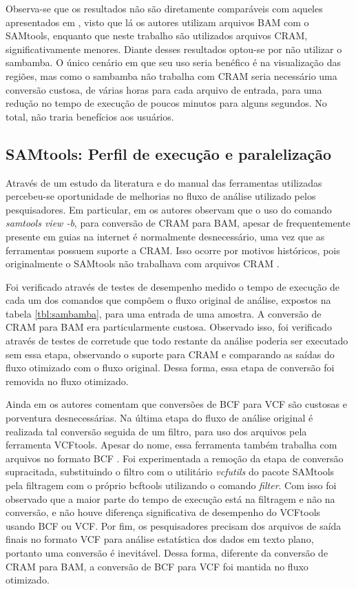 \documentclass[cic,tc]{iiufrgs}
\begin{document}
Observa-se que os resultados não são diretamente comparáveis com aqueles
apresentados em \cite{tarasov2015sambamba}, visto que lá os autores utilizam
arquivos BAM com o SAMtools, enquanto que neste trabalho são utilizados
arquivos CRAM, significativamente menores. Diante desses resultados optou-se
por não utilizar o sambamba. O único cenário em que seu uso seria benéfico é na
visualização das regiões, mas como o sambamba não trabalha com CRAM seria
necessário uma conversão custosa, de várias horas para cada arquivo de entrada,
para uma redução no tempo de execução de poucos minutos para alguns segundos.
No total, não traria benefícios aos usuários.

\subsection{SAMtools: Perfil de execução e paralelização}

Através de um estudo da literatura e do manual das ferramentas utilizadas
percebeu-se oportunidade de melhorias no fluxo de análise utilizado pelos
pesquisadores. Em particular, em \cite{danecek2021twelve} os autores observam
que o uso do comando \textit{samtools view -b}, para conversão de CRAM para
BAM, apesar de frequentemente presente em guias na internet é normalmente
desnecessário, uma vez que as ferramentas possuem suporte a CRAM. Isso ocorre
por motivos históricos, pois originalmente o SAMtools não trabalhava com
arquivos CRAM \cite{danecek2021twelve}.

Foi verificado através de testes de desempenho medido o tempo de execução de
cada um dos comandos que compõem o fluxo original de análise, expostos na
tabela \ref{tbl:sambamba}, para uma entrada de uma amostra. A conversão de CRAM
para BAM era particularmente custosa.  Observado isso, foi verificado através
de testes de corretude que todo restante da análise poderia ser executado sem
essa etapa, observando o suporte para CRAM e comparando as saídas do fluxo
otimizado com o fluxo original. Dessa forma, essa etapa de conversão foi
removida no fluxo otimizado.

Ainda em \cite{danecek2021twelve} os autores comentam que conversões de BCF
para VCF são custosas e porventura desnecessárias. Na última etapa do fluxo de
análise original é realizada tal conversão seguida de um filtro, para uso dos
arquivos pela ferramenta VCFtools. Apesar do nome, essa ferramenta também
trabalha com arquivos no formato BCF \cite{man2015vcftools}. Foi experimentada a
remoção da etapa de conversão supracitada, substituindo o filtro com o
utilitário \textit{vcfutils} do pacote SAMtools pela filtragem com o próprio
bcftools utilizando o comando \textit{filter}. Com isso foi observado que a
maior parte do tempo de execução está na filtragem e não na conversão, e não
houve diferença significativa de desempenho do VCFtools usando BCF ou VCF. Por
fim, os pesquisadores precisam dos arquivos de saída finais no formato VCF para
análise estatística dos dados em texto plano, portanto uma conversão é
inevitável. Dessa forma, diferente da conversão de CRAM para BAM, a conversão
de BCF para VCF foi mantida no fluxo otimizado.
\end{document}

